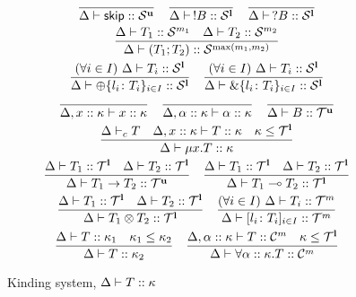 \begin{figure}[t]
  \begin{gather*}
    \frac{}{\Delta \vdash \skipk :: \kinds^\Unrestricted } \quad
    \frac{}{\Delta \vdash \,!B :: \kinds^\Linear} \quad \frac{}{\Delta
      \vdash \,?B :: \kinds^\Linear}
    \\
    \frac{\Delta \vdash T_1 :: \kinds^{m_1} \quad \Delta \vdash T_2 ::
      \kinds^{m_2}}{\Delta \vdash (T_1;T_2) :: \kinds^{\max
        (m_1,m_2)}}
    \\
    \frac{(\forall i\in I)~\Delta \vdash T_i :: \kinds^\Linear}{
      \Delta \vdash \oplus\{l_i\colon T_i\}_{i\in I} ::
      \kinds^\Linear}
    \quad
    \frac{(\forall i\in I)~\Delta \vdash T_i
      :: \kinds^\Linear}{ \Delta \vdash \&\{l_i\colon T_i\}_{i\in I} :: \kinds^\Linear}
    \\
    \frac{}{\Delta, x :: \kind \vdash x :: \kind} \quad
    \frac{}{\Delta, \alpha :: \kind \vdash \alpha :: \kind} \quad
    \frac{}{\Delta \vdash B :: \kindt^\Unrestricted}
    \\
    \frac{
      \Delta \Contr T%
      \quad
      \Delta, x :: \kind \vdash T :: \kind \quad
      \kind \le \kindt^\Linear
    }{\Delta \vdash \mu x.T :: \kind}
    \\
    \frac{
      \Delta \vdash T_1 :: \kindt^\Linear \quad
      \Delta \vdash T_2 :: \kindt^\Linear}{
      \Delta \vdash T_1\to T_2 :: \kindt^\Unrestricted}
    \quad
    \frac{
      \Delta \vdash T_1 :: \kindt^\Linear \quad
      \Delta \vdash T_2 :: \kindt^\Linear}{
      \Delta \vdash T_1\multimap T_2 :: \kindt^\Linear}
    \\
    \frac{
      \Delta \vdash T_1 :: \kindt^\Linear \quad
      \Delta \vdash T_2 :: \kindt^\Linear}{
      \Delta \vdash T_1\otimes T_2 :: \kindt^\Linear} \quad
    \frac{(\forall i\in I)~\Delta \vdash T_i :: \kindt^m}{ \Delta
      \vdash [l_i\colon T_i]_{i\in I} :: \kindt^m}
    \\
    \frac{\Delta \vdash T :: \kind_1 \quad \kind_1 \le \kind_2}{\Delta \vdash T :: \kind_2}
    \quad
    \frac{
      \Delta, \alpha :: \kind \vdash T :: \kindsch^m \quad
      \kind \le \kindt^\Linear}{
      \Delta \vdash \forall\alpha :: \kind.T :: \kindsch^m}
  \end{gather*}

  \caption{Kinding system, $\Delta \vdash T :: \kappa$}
  \label{fig:kinding}
\end{figure}

